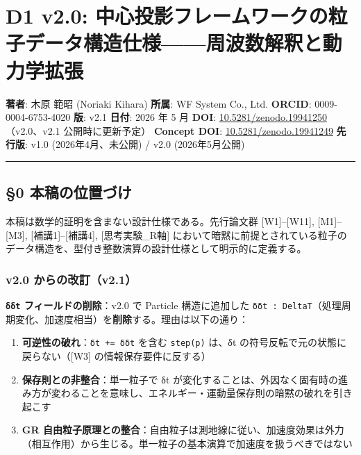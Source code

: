 \documentclass[a4paper,11pt]{ltjsarticle}
\providecommand{\tightlist}{\setlength{\itemsep}{0pt}\setlength{\parskip}{0pt}}
\begin{document}
\section{D1 v2.0:
中心投影フレームワークの粒子データ構造仕様------周波数解釈と動力学拡張}\label{d1-v2.0-ux4e2dux5fc3ux6295ux5f71ux30d5ux30ecux30fcux30e0ux30efux30fcux30afux306eux7c92ux5b50ux30c7ux30fcux30bfux69cbux9020ux4ed5ux69d8ux5468ux6ce2ux6570ux89e3ux91c8ux3068ux52d5ux529bux5b66ux62e1ux5f35}

\textbf{著者}: 木原 範昭 (Noriaki Kihara) \textbf{所属}: WF System Co.,
Ltd. \textbf{ORCID}: 0009-0004-6753-4020 \textbf{版}: v2.1
\textbf{日付}: 2026 年 5 月 \textbf{DOI}:
\href{https://doi.org/10.5281/zenodo.19941250}{10.5281/zenodo.19941250}（v2.0、v2.1
公開時に更新予定） \textbf{Concept DOI}:
\href{https://doi.org/10.5281/zenodo.19941249}{10.5281/zenodo.19941249}
\textbf{先行版}: v1.0 (2026年4月、未公開) / v2.0 (2026年5月公開)

\begin{center}\rule{0.5\linewidth}{0.5pt}\end{center}

\subsection{§0
本稿の位置づけ}\label{ux672cux7a3fux306eux4f4dux7f6eux3065ux3051}

本稿は数学的証明を含まない設計仕様である。先行論文群
{[}W1{]}--{[}W11{]}, {[}M1{]}--{[}M3{]}, {[}補講1{]}--{[}補講4{]},
{[}思考実験\_R軸{]}
において暗黙に前提とされている粒子のデータ構造を、型付き整数演算の設計仕様として明示的に定義する。

\subsubsection{v2.0
からの改訂（v2.1）}\label{v2.0-ux304bux3089ux306eux6539ux8a02v2.1}

\textbf{\texttt{δδt} フィールドの削除}：v2.0 で Particle 構造に追加した
\texttt{δδt\ :\ DeltaT}（処理周期変化、加速度相当）を\textbf{削除}する。理由は以下の通り：

\begin{enumerate}
\def\labelenumi{\arabic{enumi}.}
\tightlist
\item
  \textbf{可逆性の破れ}：\texttt{δt\ +=\ δδt} を含む \texttt{step(p)}
  は、δt の符号反転で元の状態に戻らない（{[}W3{]}
  の情報保存要件に反する）
\item
  \textbf{保存則との非整合}：単一粒子で δt
  が変化することは、外因なく固有時の進み方が変わることを意味し、エネルギー・運動量保存則の暗黙の破れを引き起こす
\item
  \textbf{GR
  自由粒子原理との整合}：自由粒子は測地線に従い、加速度効果は外力（相互作用）から生じる。単一粒子の基本演算で加速度を扱うべきではない
\end{enumerate}
\end{document}
